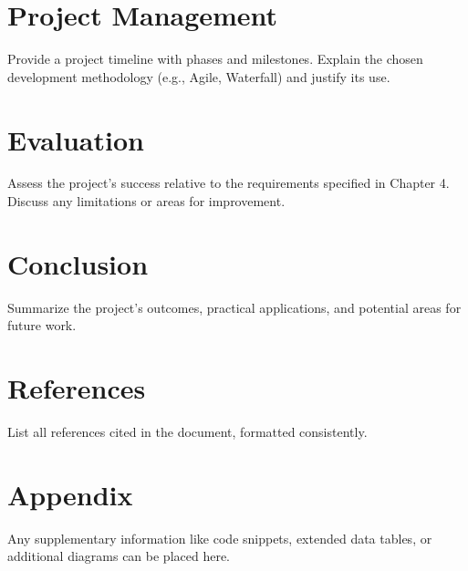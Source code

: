\documentclass[12pt,a4paper]{report}
\begin{document}
\chapter{Project Management}
    Provide a project timeline with phases and milestones. Explain the chosen development methodology (e.g., Agile, Waterfall) and justify its use.

\chapter{Evaluation}
    Assess the project’s success relative to the requirements specified in Chapter 4. Discuss any limitations or areas for improvement.

\chapter{Conclusion}
    Summarize the project’s outcomes, practical applications, and potential areas for future work.

\chapter*{References}
    List all references cited in the document, formatted consistently.

\appendix
\chapter{Appendix}
    Any supplementary information like code snippets, extended data tables, or additional diagrams can be placed here.
\end{document}
